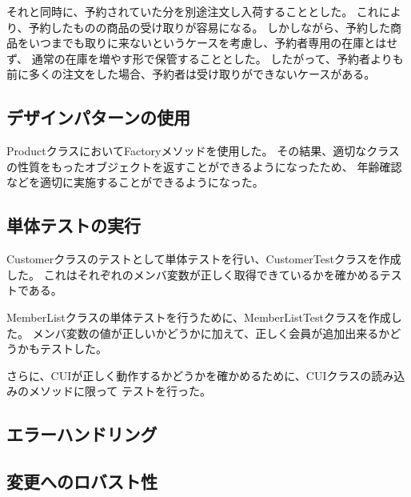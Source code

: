 \documentclass[a4paper,11pt]{jsarticle}
\begin{document}
それと同時に、予約されていた分を別途注文し入荷することとした。
これにより、予約したものの商品の受け取りが容易になる。
しかしながら、予約した商品をいつまでも取りに来ないというケースを考慮し、予約者専用の在庫とはせず、
通常の在庫を増やす形で保管することとした。
したがって、予約者よりも前に多くの注文をした場合、予約者は受け取りができないケースがある。


\subsection{デザインパターンの使用}

ProductクラスにおいてFactoryメソッドを使用した。
その結果、適切なクラスの性質をもったオブジェクトを返すことができるようになったため、
年齢確認などを適切に実施することができるようになった。

\subsection{単体テストの実行}

Customerクラスのテストとして単体テストを行い、CustomerTestクラスを作成した。
これはそれぞれのメンバ変数が正しく取得できているかを確かめるテストである。

MemberListクラスの単体テストを行うために、MemberListTestクラスを作成した。
メンバ変数の値が正しいかどうかに加えて、正しく会員が追加出来るかどうかもテストした。

さらに、CUIが正しく動作するかどうかを確かめるために、CUIクラスの読み込みのメソッドに限って
テストを行った。

\subsection{エラーハンドリング}
\subsection{変更へのロバスト性}
\end{document}
